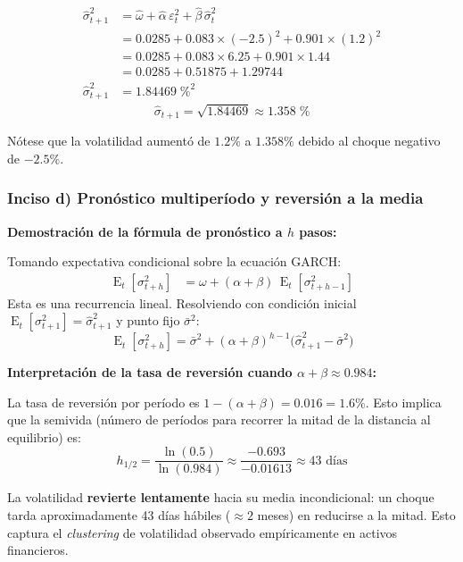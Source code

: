 \documentclass[12pt,a4paper]{article}
\DeclareMathOperator{\E}{E}
\begin{document}
\begin{solucion}
\begin{align*}
\hat{\sigma}_{t+1}^2 &= \hat{\omega} + \hat{\alpha}\,\varepsilon_t^2 + \hat{\beta}\,\hat{\sigma}_t^2\\
&= 0.0285 + 0.083\times(-2.5)^2 + 0.901\times(1.2)^2\\
&= 0.0285 + 0.083\times 6.25 + 0.901\times 1.44\\
&= 0.0285 + 0.51875 + 1.29744\\
\hat{\sigma}_{t+1}^2 &= 1.84469 \;\%^2
\end{align*}
\begin{equation}
\boxed{\hat{\sigma}_{t+1} = \sqrt{1.84469} \approx 1.358\;\%}
\end{equation}

Nótese que la volatilidad aumentó de $1.2\%$ a $1.358\%$ debido al choque negativo de $-2.5\%$.
\end{solucion}

\subsubsection*{Inciso d) Pronóstico multiperíodo y reversión a la media}

\begin{solucion}
\textbf{Demostración de la fórmula de pronóstico a $h$ pasos:}

Tomando expectativa condicional sobre la ecuación GARCH:
\begin{align*}
\E_t[\sigma_{t+h}^2] &= \omega + (\alpha+\beta)\,\E_t[\sigma_{t+h-1}^2]
\end{align*}
Esta es una recurrencia lineal. Resolviendo con condición inicial $\E_t[\sigma_{t+1}^2]=\hat{\sigma}_{t+1}^2$ y punto fijo $\bar{\sigma}^2$:
\begin{equation}
\boxed{\E_t[\sigma_{t+h}^2] = \bar{\sigma}^2 + (\alpha+\beta)^{h-1}\bigl(\hat{\sigma}_{t+1}^2 - \bar{\sigma}^2\bigr)}
\end{equation}

\textbf{Interpretación de la tasa de reversión cuando $\alpha+\beta\approx0.984$:}

La tasa de reversión por período es $1-(\alpha+\beta)=0.016=1.6\%$. Esto implica que la semivida (número de períodos para recorrer la mitad de la distancia al equilibrio) es:
\begin{equation}
h_{1/2} = \frac{\ln(0.5)}{\ln(0.984)} \approx \frac{-0.693}{-0.01613} \approx 43 \text{ días}
\end{equation}

La volatilidad \textbf{revierte lentamente} hacia su media incondicional: un choque tarda aproximadamente 43 días hábiles ($\approx 2$ meses) en reducirse a la mitad. Esto captura el \emph{clustering} de volatilidad observado empíricamente en activos financieros.
\end{solucion}
\end{document}
